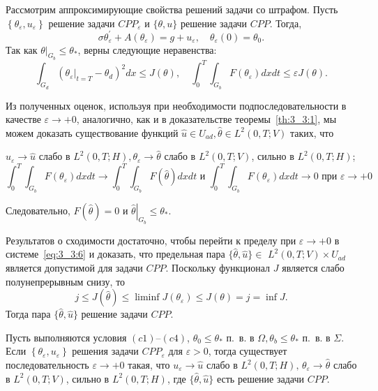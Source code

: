 Рассмотрим аппроксимирующие свойства решений задачи со штрафом.
Пусть $\left\{\theta_{\varepsilon}, u_{\varepsilon}\right\}$ решение задачи
$CPP_{\varepsilon}$ и $\{\theta, u\}$ решение задачи $CPP$.
Тогда,
\begin{equation}
    \label{eq:3_3:6}
    \sigma \theta_{\varepsilon}^{\prime}
    + A\left(\theta_{\varepsilon}\right)=g + u_{\varepsilon},
    \quad \theta_{\varepsilon}(0) = \theta_{0}.
\end{equation}
Так как $\left.\theta\right|_{G_{b}} \leq \theta_{*}$, верны следующие неравенства:
\[
    \int_{G_{d}}\left(\left.\theta_{\varepsilon}\right|_{t=T}-\theta_{d}\right)^{2} d x \leq J(\theta),
    \quad \int_{0}^{T} \int_{G_{b}} F\left(\theta_{\varepsilon}\right) d x d t \leq \varepsilon J(\theta).
\]


Из полученных оценок, используя при необходимости подпоследовательности в качестве
$\varepsilon \rightarrow+0$, аналогично, как и в доказательстве теоремы~\ref{th:3_3:1},
мы можем доказать существование функций
$\widehat{u} \in U_{a d}, \widehat{\theta} \in L^{2}(0, T ; V)$ таких, что

$u_{\varepsilon} \rightarrow \widehat{u}$ слабо в
$L^{2}(0, T ; H), \theta_{\varepsilon} \rightarrow \widehat{\theta}$ слабо в $L^{2}(0, T ; V)$,
сильно в $L^{2}(0, T ; H)$;
\[
    \int_{0}^{T} \int_{G_{b}} F\left(\theta_{\varepsilon}\right) d x d t \rightarrow \int_{0}^{T}
    \int_{G_{b}} F(\widehat{\theta}) dx dt\text { и }\int_{0}^{T} \int_{G_{b}}
    F\left(\theta_{\varepsilon}\right) dx dt \rightarrow 0
    \text{ при } \varepsilon \rightarrow+0
\]

Следовательно, $F(\widehat{\theta})=0$ и
$\left.\widehat{\theta}\right|_{G_{b}} \leq \theta_{*}$.

Результатов о сходимости достаточно, чтобы перейти к пределу при $\varepsilon \rightarrow+0$
в системе~\eqref{eq:3_3:6} и доказать, что предельная пара
$\{\widehat{\theta}, \widehat{u}\} \in$ $L^{2}(0, T ; V) \times U_{a d}$
является допустимой для задачи $CPP$.
Поскольку функционал $J$ является слабо полунепрерывным снизу, то
\[
    j \leq J(\widehat{\theta}) \leq \liminf J\left(\theta_{\varepsilon}\right) \leq J(\theta)=j=\inf J.
\]
Тогда пара $\{\widehat{\theta}, \widehat{u}\}$ решение задачи $CPP$.
\begin{theorem}
    Пусть выполняются условия $(c1)$--$(c4)$,
    $\theta_{0} \leq \theta_{*}$ п.\ в. в $\Omega, \theta_{b} \leq \theta_{*}$ п.\ в. в
    $\Sigma$.
    Если $\left\{\theta_{\varepsilon}, u_{\varepsilon}\right\}$ решения задачи
    $CPP_{\varepsilon}$ для $\varepsilon>0$, тогда существует последовательность
    $\varepsilon \rightarrow+0$ такая, что $u_{\varepsilon} \rightarrow \widehat{u}$ слабо в
    $L^{2}(0, T ; H), \, \theta_{\varepsilon} \rightarrow \widehat{\theta}$
    слабо в $L^{2}(0, T ; V)$, сильно в $L^{2}(0, T ; H)$, где
    $\{\widehat{\theta}, \widehat{u}\}$ есть решение задачи $CPP$.
\end{theorem}
